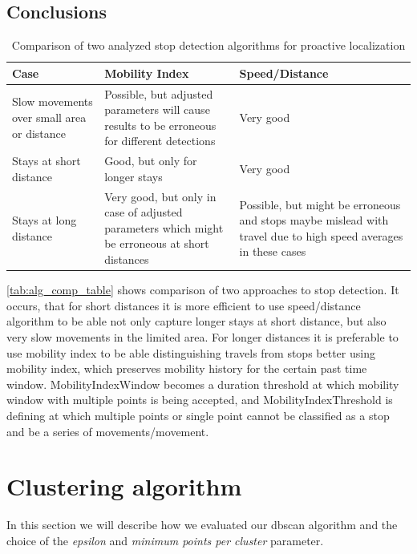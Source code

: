 \subsection{Conclusions}

\begin{table}[h!]
	\centering
	\caption{Comparison of two analyzed stop detection algorithms for proactive localization}
	\label{tab:alg_comp_table}
	\begin{tabular}{|L|L|L|}\hline
		\textbf{Case} & \textbf{Mobility Index} & \textbf{Speed/Distance} 
		\\\hline
		Slow movements over small area or distance & Possible, but adjusted parameters will cause results to be erroneous for different detections & Very good
		\\\hline
		Stays at short distance & Good, but only for longer stays & Very good  
		\\\hline
		Stays at long distance & Very good, but only in case of adjusted parameters which might be erroneous at short distances & Possible, but might be erroneous and stops maybe mislead with travel due to high speed averages in these cases
		\\\hline
	\end{tabular}
\end{table}
\FloatBarrier 

\autoref{tab:alg_comp_table} shows comparison of two approaches to stop detection. It occurs, that for short distances it is more efficient to use speed/distance algorithm to be able not only capture longer stays at short distance, but also very slow movements in the limited area. For longer distances it is preferable to use mobility index to be able distinguishing travels from stops better using mobility index, which preserves mobility history for the certain past time window. MobilityIndexWindow becomes a duration threshold at which mobility window with multiple points is being accepted, and MobilityIndexThreshold is defining at which multiple points or single point cannot be classified as a stop and be a series of movements/movement. 

\section{Clustering algorithm}

In this section we will describe how we evaluated our dbscan algorithm and the choice of the \textit{epsilon} and \textit{minimum points per cluster} parameter.

